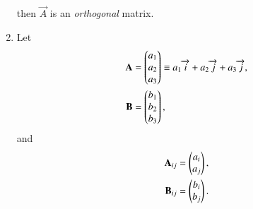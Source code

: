 \begin{enumerate}[label=\thesection.\arabic*.,ref=\thesection.\theenumi]
		then $	\vec{A}$ is an {\em orthogonal} matrix.
\item Let 
\begin{align}
  \mathbf{A} &= \begin{pmatrix}a_1\\a_2 \\ a_3\end{pmatrix} \equiv a_1\overrightarrow{i}+a_2\overrightarrow{j}+a_3\overrightarrow{j}, 
  \\
  \mathbf{B} &= \begin{pmatrix}b_1\\b_2 \\ b_3\end{pmatrix}, 
\end{align}
and 
\begin{align}
  \label{eq:cross3d-submat}
\begin{split}
  \mathbf{A}_{ij} &= \begin{pmatrix}a_i\\a_j\end{pmatrix}, 
  \\
  \mathbf{B}_{ij} &= \begin{pmatrix}b_i\\b_j\end{pmatrix}. 
\end{split}
\end{align}


\end{enumerate}

